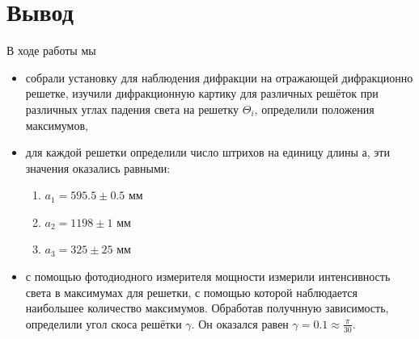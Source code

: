 \documentclass[a4paper, 12pt]{article}
\begin{document}
\section{Вывод}

В ходе работы мы
 \begin{itemize}

	\item собрали установку для наблюдения дифракции на отражающей дифракционно решетке, изучили дифракционную картику для различных решёток при различных углах падения света на решетку $\Theta_i$, определили положения максимумов,

	\item для каждой решетки определили число штрихов на единицу длины $а$, эти значения оказались равными: 
		 \begin{enumerate}
			\item $a_1 = 595.5 \pm 0.5 $ мм
			\item $a_2 = 1198 \pm 1 $ мм
			\item $a_3 = 325 \pm 25 $ мм
		 \end{enumerate}

	\item с помощью фотодиодного измерителя мощности измерили интенсивность света в максимумах для решетки, с помощью которой наблюдается наибольшее количество максимумов. Обработав получнную зависимость, определили угол скоса решётки $\gamma$. Он оказался равен $\gamma = 0.1 \approx \frac {\pi}{30}$.

\end{itemize}
\end{document}
